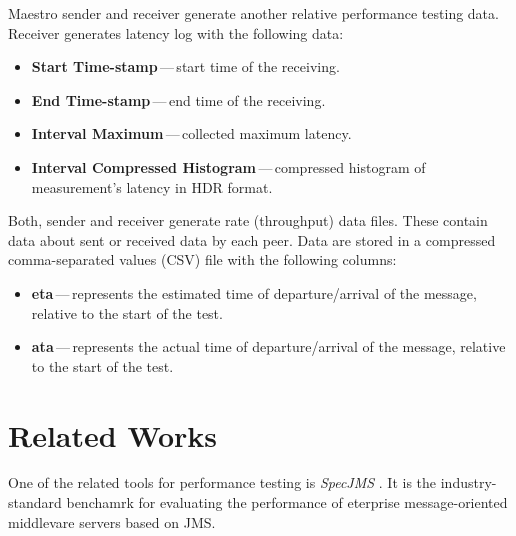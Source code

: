 Maestro sender and receiver generate another relative performance testing data. Receiver generates latency log with the following data:

\begin{itemize}
	\setlength\itemsep{0em}
	\item \textbf{Start Time-stamp}\,---\,start time of the receiving.
	\item \textbf{End Time-stamp}\,---\,end time of the receiving.
	\item \textbf{Interval Maximum}\,---\,collected maximum latency.
	\item \textbf{Interval Compressed Histogram}\,---\,compressed histogram of measurement's latency in HDR\footnotemark{} format.
\end{itemize}

Both, sender and receiver generate rate (throughput) data files. These contain data about sent or received data by each peer. Data are stored in a compressed comma-separated values (CSV) file with the following columns:

\begin{itemize}
	\setlength\itemsep{0em}
	\item \textbf{eta}\,---\,represents the estimated time of departure/arrival of the message, relative to the start of the test.
	\item \textbf{ata}\,---\,represents the actual time of departure/arrival of the message, relative to the start of the test.
\end{itemize}


\section{Related Works}
\label{Related Works}

One of the related tools for performance testing is \emph{SpecJMS} \cite{SPECJMS}. It is the industry-standard benchamrk for evaluating the performance of eterprise message-oriented middlevare servers based on JMS.


